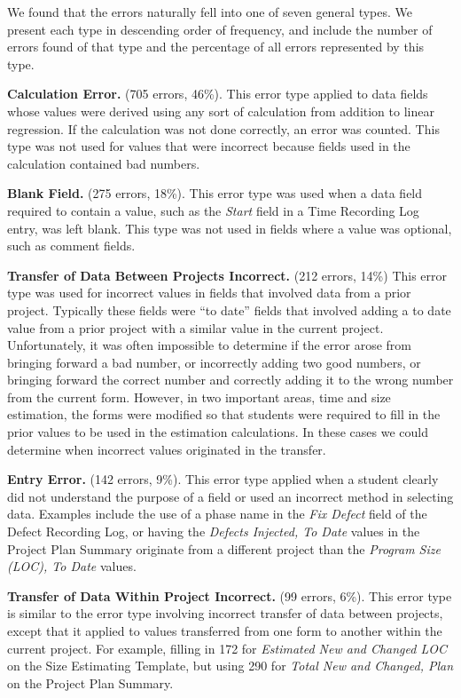 We found that the errors naturally fell into one of seven general types.
We present each type in descending order of frequency, and include the
number of errors found of that type and the percentage of all errors
represented by this type.

{\bf Calculation Error.} (705 errors, 46\%). This error type applied
to data fields whose values were derived using any sort of calculation from
addition to linear regression.  If the calculation was not done correctly,
an error was counted.  This type was not used for values that were
incorrect because fields used in the calculation contained bad
numbers.
        
{\bf Blank Field.} (275 errors, 18\%). This error type was used when a data field
required to contain a value, such as the {\it Start} field in a Time
Recording Log entry, was left blank.  This type was not used in fields
where a value was optional, such as comment fields.
        
{\bf Transfer of Data Between Projects Incorrect.} (212 errors, 14\%) This
error type was used for incorrect values in fields that involved data from
a prior project.  Typically these fields were ``to date'' fields that
involved adding a to date value from a prior project with a similar value
in the current project.  Unfortunately, it was often impossible to
determine if the error arose from bringing forward a bad number,
or incorrectly adding two good numbers, or bringing forward the correct number
and correctly adding it to the wrong number from the current form.
However, in two important areas, time and size estimation, the forms were
modified so that students were required to fill in the prior values to be
used in the estimation calculations. In these cases we could determine
when incorrect values originated in the transfer.
        
{\bf Entry Error.} (142 errors, 9\%). This error type applied when a
student clearly did not understand the purpose of a field or used an
incorrect method in selecting data.  Examples include the use of a phase
name in the {\it Fix Defect} field of the Defect Recording Log, or having
the {\it Defects Injected, To Date} values in the Project Plan Summary
originate from a different project than the {\it Program Size (LOC), To
  Date} values.
      
{\bf Transfer of Data Within Project Incorrect.} (99 errors, 6\%). This
error type is similar to the error type involving incorrect transfer of
data between projects, except that it applied to values transferred from
one form to another within the current project.  For example, filling in
172 for {\it Estimated New and Changed LOC} on the Size Estimating
Template, but using 290 for {\it Total New and Changed, Plan} on the
Project Plan Summary.
    
